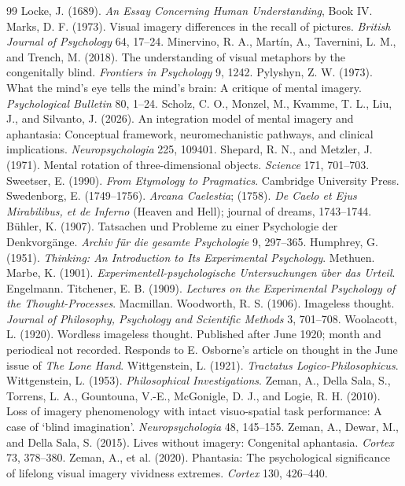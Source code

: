 \documentclass[11pt]{article}
\theoremstyle{remark}
\begin{document}
\begin{thebibliography}{99}
 Locke, J. (1689). \emph{An Essay Concerning Human Understanding}, Book IV.
 Marks, D. F. (1973). Visual imagery differences in the recall of pictures. \emph{British Journal of Psychology} 64, 17--24.
 Minervino, R. A., Mart\'in, A., Tavernini, L. M., and Trench, M. (2018). The understanding of visual metaphors by the congenitally blind. \emph{Frontiers in Psychology} 9, 1242.
 Pylyshyn, Z. W. (1973). What the mind's eye tells the mind's brain: A critique of mental imagery. \emph{Psychological Bulletin} 80, 1--24.
 Scholz, C. O., Monzel, M., Kvamme, T. L., Liu, J., and Silvanto, J. (2026). An integration model of mental imagery and aphantasia: Conceptual framework, neuromechanistic pathways, and clinical implications. \emph{Neuropsychologia} 225, 109401.
 Shepard, R. N., and Metzler, J. (1971). Mental rotation of three-dimensional objects. \emph{Science} 171, 701--703.
 Sweetser, E. (1990). \emph{From Etymology to Pragmatics}. Cambridge University Press.
 Swedenborg, E. (1749--1756). \emph{Arcana Caelestia}; (1758). \emph{De Caelo et Ejus Mirabilibus, et de Inferno} (Heaven and Hell); journal of dreams, 1743--1744.
 B\"uhler, K. (1907). Tatsachen und Probleme zu einer Psychologie der Denkvorg\"ange. \emph{Archiv f\"ur die gesamte Psychologie} 9, 297--365.
 Humphrey, G. (1951). \emph{Thinking: An Introduction to Its Experimental Psychology}. Methuen.
 Marbe, K. (1901). \emph{Experimentell-psychologische Untersuchungen \"uber das Urteil}. Engelmann.
 Titchener, E. B. (1909). \emph{Lectures on the Experimental Psychology of the Thought-Processes}. Macmillan.
 Woodworth, R. S. (1906). Imageless thought. \emph{Journal of Philosophy, Psychology and Scientific Methods} 3, 701--708.
 Woolacott, L. (1920). Wordless imageless thought. Published after June 1920; month and periodical not recorded. Responds to E. Osborne's article on thought in the June issue of \emph{The Lone Hand}.
 Wittgenstein, L. (1921). \emph{Tractatus Logico-Philosophicus}.
 Wittgenstein, L. (1953). \emph{Philosophical Investigations}.
 Zeman, A., Della Sala, S., Torrens, L. A., Gountouna, V.-E., McGonigle, D. J., and Logie, R. H. (2010). Loss of imagery phenomenology with intact visuo-spatial task performance: A case of `blind imagination'. \emph{Neuropsychologia} 48, 145--155.
 Zeman, A., Dewar, M., and Della Sala, S. (2015). Lives without imagery: Congenital aphantasia. \emph{Cortex} 73, 378--380.
 Zeman, A., et al. (2020). Phantasia: The psychological significance of lifelong visual imagery vividness extremes. \emph{Cortex} 130, 426--440.
\end{thebibliography}
\end{document}
